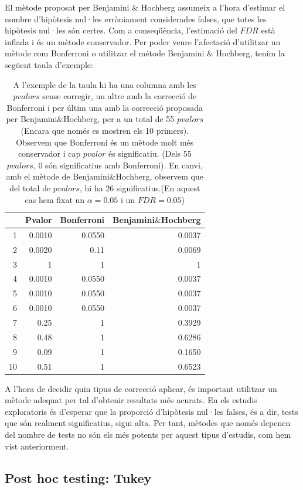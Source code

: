 \documentclass[english]{article}
\begin{document}
El mètode proposat per Benjamini $\&$ Hochberg assumeix a l'hora d'estimar el nombre d'hipòtesis nul·les erròniament considerades falses, que totes les hipòtesis nul·les són certes. Com a conseqüència, l'estimació del $FDR$ està inflada i és un mètode conservador. Per poder veure l'afectació d'utilitzar un mètode com Bonferroni o utilitzar el métode Benjamini $\&$ Hochberg, tenim la següent taula d'exemple:
\\
\begin{table}[ht]
\centering
\begin{tabular}{rrrr}
\hline
& Pvalor & Bonferroni & Benjamini$\&$Hochberg \\
\hline
1 & 0.0010 & 0.0550 & 0.0037 \\
2 & 0.0020 & 0.11 & 0.0069 \\
3 & 1 & 1 & 1 \\
4 & 0.0010 & 0.0550 & 0.0037 \\
5 & 0.0010 & 0.0550 & 0.0037 \\
6 & 0.0010 & 0.0550 & 0.0037 \\
7 & 0.25 & 1 & 0.3929 \\
8 & 0.48 & 1 & 0.6286 \\
9 & 0.09 & 1 & 0.1650 \\
10 & 0.51 & 1 & 0.6523 \\
\hline
\end{tabular}
\caption{A l'exemple de la taula hi ha una columna amb les $pvalors$ sense corregir, un altre amb la correcció de Bonferroni i per últim una amb la correcció proposada per Benjamini$\&$Hochberg, per a un total de 55 $pvalors$ (Encara que només es mostren els 10 primers). Observem que Bonferroni és un mètode molt més conservador i cap $pvalor$ és significatiu. (Dels 55 $pvalors$, 0 són significatius amb Bonferroni). En canvi, amb el mètode de Benjamini$\&$Hochberg, observem que del total de $pvalors$, hi ha 26 significatius.(En aquest cas hem fixat un $\alpha=0.05$ i un $FDR=0.05$) }
\end{table}

A l'hora de decidir quin tipus de correcció aplicar, és important utilitzar un mètode adequat per tal d'obtenir resultats més acurats. En els estudis exploratoris és d'esperar que la proporció d'hipòtesis nul·les falses, és a dir, tests que són realment significatius, sigui alta. Per tant, mètodes que només depenen del nombre de tests no són els més potents per aquest tipus d'estudis, com hem vist anteriorment.

\subsection{Post hoc testing: Tukey}
\end{document}
